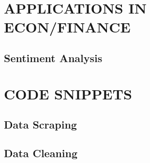 \documentclass[
]{book}
\begin{document}
\hypertarget{part-applications-in-econfinance}{%
\part*{APPLICATIONS IN ECON/FINANCE}\label{part-applications-in-econfinance}}

\hypertarget{sentiment-analysis}{%
\chapter{Sentiment Analysis}\label{sentiment-analysis}}

\hypertarget{part-code-snippets}{%
\part*{CODE SNIPPETS}\label{part-code-snippets}}

\hypertarget{data-scraping}{%
\chapter{Data Scraping}\label{data-scraping}}

\hypertarget{data-cleaning}{%
\chapter{Data Cleaning}\label{data-cleaning}}

  
\end{document}
